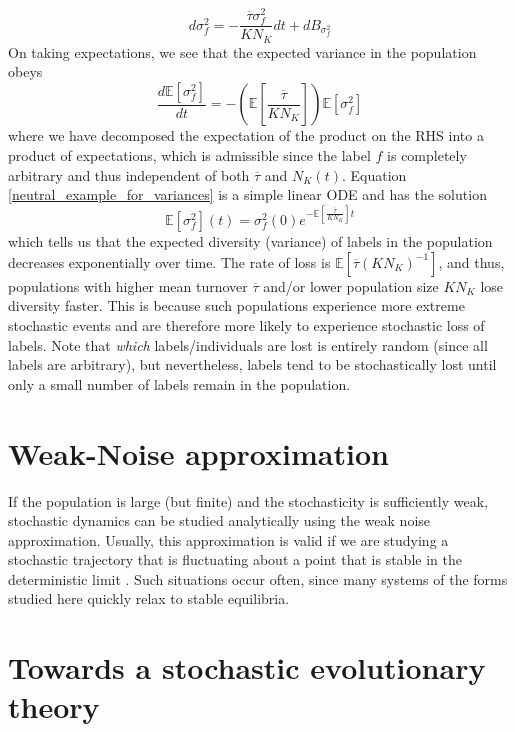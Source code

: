 \begin{equation}
d\sigma^2_f = - \frac{\overline{\tau}\sigma^2_{f}}{KN_K}dt + dB_{\sigma^2_{f}}
\end{equation}
On taking expectations, we see that the expected variance in the population obeys
\begin{equation}
\label{neutral_example_for_variances}
\frac{d \mathbb{E}[\sigma^2_f]}{dt} = - \left(\mathbb{E}\left[\frac{\overline{\tau}}{KN_K}\right]\right)\mathbb{E}[\sigma^2_{f}]
\end{equation}
where we have decomposed the expectation of the product on the RHS into a product of expectations, which is admissible since the label $f$ is completely arbitrary and thus independent of both $\overline{\tau}$ and $N_K(t)$. Equation \eqref{neutral_example_for_variances} is a simple linear ODE and has the solution
\begin{equation}
\mathbb{E}[\sigma^2_f](t) = \sigma^2_f(0)e^{-\mathbb{E}\left[\frac{\overline{\tau}}{KN_K}\right]t}
\end{equation}
which tells us that the expected diversity (variance) of labels in the population decreases exponentially over time. The rate of loss is $\mathbb{E}\left[\overline{\tau}(KN_K)^{-1}\right]$, and thus, populations with higher mean turnover $\overline{\tau}$  and/or lower population size $KN_K$ lose diversity faster. This is because such populations experience more extreme stochastic events and are therefore more likely to experience stochastic loss of labels. Note that \emph{which} labels/individuals are lost is entirely random (since all labels are arbitrary), but nevertheless, labels tend to be stochastically lost until only a small number of labels remain in the population.


\section{Weak-Noise approximation}
If the population is large (but finite) and the stochasticity is sufficiently weak, stochastic dynamics can be studied analytically using the weak noise approximation. Usually, this approximation is valid if we are studying a stochastic trajectory that is fluctuating about a point that is stable in the deterministic limit \citep{van_kampen_stochastic_1981}. Such situations occur often, since many systems of the forms studied here quickly relax to stable equilibria.


\section{Towards a stochastic evolutionary theory}

